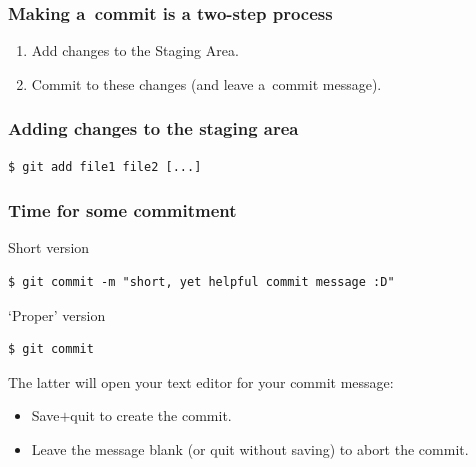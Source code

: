 \documentclass[12pt]{beamer}
\begin{document}
\begin{frame}
  \frametitle{Making a~commit is a two-step process}

  \begin{enumerate}
    \item\alert{Add} changes to the Staging Area.
    \item\alert{Commit} to these changes (and leave a~commit message).
  \end{enumerate}
\end{frame}

\begin{frame}[fragile]
  \frametitle{Adding changes to the staging area}

  {\footnotesize{}%
    \begin{verbatim}
$ git add file1 file2 [...]
    \end{verbatim}%
  }
\end{frame}

\begin{frame}[fragile]
  \frametitle{Time for some commitment}

  \begin{block}{Short version}
    {\footnotesize{}%
      \begin{verbatim}
$ git commit -m "short, yet helpful commit message :D"
      \end{verbatim}%
    }
  \end{block}

  \begin{block}{`Proper' version}
    {\footnotesize{}%
      \begin{verbatim}
$ git commit
      \end{verbatim}%
    }
  \end{block}

  The latter will open your text editor for your commit message:
  \begin{itemize}
    \item Save$+$quit to create the commit.
    \item Leave the message blank (or quit without saving) to abort the commit.
  \end{itemize}
\end{frame}
\end{document}

